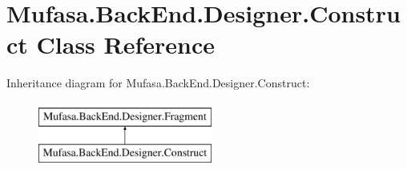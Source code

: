 \hypertarget{class_mufasa_1_1_back_end_1_1_designer_1_1_construct}{\section{Mufasa.\+Back\+End.\+Designer.\+Construct Class Reference}
\label{class_mufasa_1_1_back_end_1_1_designer_1_1_construct}
}
Inheritance diagram for Mufasa.\+Back\+End.\+Designer.\+Construct\+:\begin{figure}[H]
\begin{center}
\leavevmode
\includegraphics[height=2.000000cm]{class_mufasa_1_1_back_end_1_1_designer_1_1_construct}
\end{center}
\end{figure}
